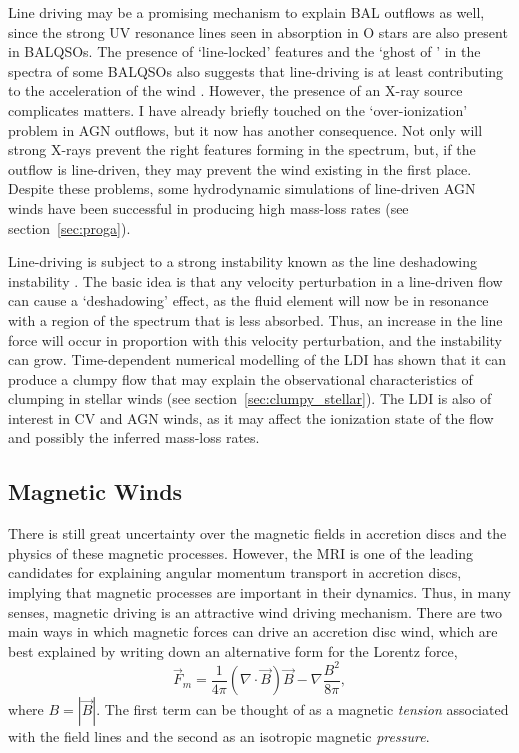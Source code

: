 Line driving may be a promising mechanism to explain BAL outflows as well, since
the strong UV resonance lines seen in absorption in O stars are also 
present in BALQSOs. The presence of `line-locked' features \citep{bowler2014} 
and the `ghost of \la' \citep{arav1995, arav1996, north2006}
in the spectra of some BALQSOs also suggests that line-driving is
at least contributing to the acceleration of the wind 
\citep[but see also][]{cottis2010}.
However, the presence of an X-ray source complicates matters.
I have already briefly touched on the `over-ionization' problem
in AGN outflows, but it now has another consequence. Not only will 
strong X-rays prevent the right features forming in the spectrum, but, if
the outflow is line-driven, they may prevent the wind existing in the first 
place. Despite these problems, some hydrodynamic simulations of line-driven AGN winds
have been successful in producing high mass-loss rates (see section~\ref{sec:proga}).

Line-driving is subject to a strong instability known
as the line deshadowing instability 
\citep[LDI;][]{lucysolomon1970,macgregor1979,owockirybicki1984,owockirybicki1985}.
The basic idea is that any velocity perturbation in a line-driven flow can cause a 
`deshadowing' effect, as the fluid element will now
be in resonance with a region of the spectrum that is less absorbed.
Thus, an increase in the line force will occur in proportion
with this velocity perturbation, and the instability can grow. 
Time-dependent numerical modelling of the LDI has shown that it can
produce a clumpy flow \citep{owocki1988,feldmeier1995,surlan2012,owocki2014}
that may explain the observational characteristics of clumping in 
stellar winds (see section~\ref{sec:clumpy_stellar}). 
The LDI is also of interest in CV and AGN winds, as it
may affect the ionization state of the flow and possibly the inferred
mass-loss rates. 


\subsection{Magnetic Winds}
\label{sec:mag_winds}
There is still great uncertainty over the magnetic fields in accretion discs
and the physics of these magnetic processes. However, the MRI is one of the 
leading candidates for explaining angular momentum transport in accretion discs,
implying that magnetic processes are important in their dynamics. 
Thus, in many senses, magnetic driving is an attractive wind driving mechanism.
There are two main ways in which magnetic forces can drive an 
accretion disc wind, which are best explained by writing down an 
alternative form for the Lorentz force,
\begin{equation}
\vec{F}_m = \frac{1}{4\pi} (\nabla \cdot \vec{B}) \vec{B}  - \nabla \frac{B^2}{8\pi},
\end{equation}
where $B = |\vec{B}|$.
The first term can be thought of as a magnetic {\em tension}
associated with the field lines and the second as an isotropic magnetic
{\em pressure}.


